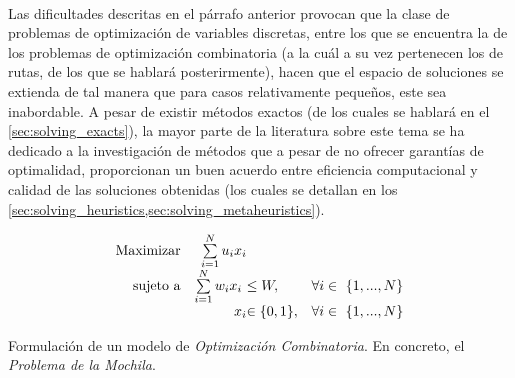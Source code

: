 \documentclass{subfiles}
\begin{document}
        \paragraph{}
        Las dificultades descritas en el párrafo anterior provocan que la clase de problemas de optimización de variables discretas, entre los que se encuentra la de los problemas de optimización combinatoria (a la cuál a su vez pertenecen los de rutas, de los que se hablará posterirmente), hacen que el espacio de soluciones se extienda de tal manera que para casos relativamente pequeños, este sea inabordable. A pesar de existir métodos exactos (de los cuales se hablará en el \cref{sec:solving_exacts}), la mayor parte de la literatura sobre este tema se ha dedicado a la investigación de métodos que a pesar de no ofrecer garantías de optimalidad, proporcionan un buen acuerdo entre eficiencia computacional y calidad de las soluciones obtenidas (los cuales se detallan en los \cref{sec:solving_heuristics,sec:solving_metaheuristics}).

        \begin{eqfloat}
          \begin{equation}
            \begin{array}{rr@{}ll}
              \text{Maximizar} & \sum\limits_{i = 1}^{N} u_{i}x_{i} &                 & \\
              \text{sujeto a}	 & \sum\limits_{i = 1}^{N} w_{i}x_{i} \ &\leq W, & \forall i \in \{1,...,N\} \\
                               &                             	x_{i} 	&\in \{0, 1\}, 	                 & \forall i \in \{1,...,N\}
            \end{array}
          \end{equation}
          \caption{Formulación de un modelo de \emph{Optimización Combinatoria}. En concreto, el \emph{Problema de la Mochila}.}
          \label{eq:combinatorial_optimization_formulation}
        \end{eqfloat}
\end{document}
